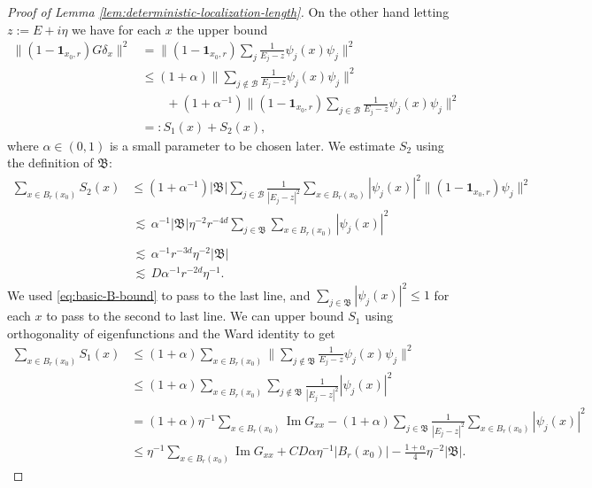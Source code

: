 \documentclass[11pt]{amsart}
\def\One{{\mathbf{1}}}
\newcommand{\Impt}{\operatorname*{Im}}
\def\lsim{{\,\lesssim\,}}
\newcommand{\mcal}[1]{{\mathcal{#1}}}
\numberwithin{equation}{section}
\numberwithin{theorem}{section}
\begin{document}
\begin{proof}[Proof of Lemma \ref{lem:deterministic-localization-length}]
On the other hand letting $z:= E + i\eta$ we have for each $x$ the upper bound
\begin{equation}
\label{eq:two-bd}
\begin{aligned}
\|(1-\One_{x_0,r}) G\delta_x\|^2
&= \|(1-\One_{x_0,r}) \sum_j \frac{1}{E_j-z} \psi_j(x) \psi_j\|^2 \\
&\leq (1+\alpha) \|\sum_{j\not\in\mcal{B}} \frac{1}{E_j-z} \psi_j(x) \psi_j\|^2 \\
&\qquad + (1+\alpha^{-1})\|(1-\One_{x_0,r}) \sum_{j\in\mcal{B}} \frac{1}{E_j-z} \psi_j(x) \psi_j\|^2 \\
&=: S_1(x) + S_2(x),
\end{aligned}
\end{equation}
where $\alpha\in (0,1)$ is a small parameter to be chosen later. We estimate
$S_2$  using the definition of $\mathfrak{B}$:
\begin{align*}
\sum_{x\in B_r(x_0)} S_2(x)
&\leq (1+\alpha^{-1}) |\mathfrak{B}| \sum_{j\in\mcal{B}} \frac{1}{|E_j-z|^2} \sum_{x\in B_r(x_0)}|\psi_j(x)|^2
\|(1-\One_{x_0,r})\psi_j\|^2 \\
&\lsim \alpha^{-1} |\mathfrak{B}| \eta^{-2} r^{-4d}\sum_{j\in\mathfrak{B}}  \sum_{x\in B_r(x_0)}|\psi_j(x)|^2\\\\
& \lsim \alpha^{-1}r^{-3d}\eta^{-2} |\mathfrak{B}|\\
& \lsim D\alpha^{-1}r^{-2d}\eta^{-1} .
\end{align*}
We used \eqref{eq:basic-B-bound} to pass to the last line, and $\sum_{j\in \mathfrak{B}}|\psi_j(x)|^2 \leq 1$ for each $x$ to pass to the second to last line.
We can upper bound $S_1$ using orthogonality of eigenfunctions and the Ward identity to get
\begin{align*}
\sum_{x\in B_r(x_0)} S_1(x)
&\leq (1+\alpha) \sum_{x\in B_r(x_0)}
\| \sum_{j\not\in \mathfrak{B}} \frac{1}{E_j-z} \psi_j(x) \psi_j\|^2 \\
&\leq (1+\alpha) \sum_{x\in B_r(x_0)}
\sum_{j\not\in\mathfrak{B}} \frac{1}{|E_j-z|^2} |\psi_j(x)|^2 \\
&= (1+\alpha) \eta^{-1}\sum_{x\in B_r(x_0)} \Impt G_{xx}
- (1+\alpha) \sum_{j\in \mathfrak{B}} \frac{1}{|E_j-z|^2}\sum_{x\in B_r(x_0)} |\psi_j(x)|^2  \\
&\leq \eta^{-1} \sum_{x\in B_r(x_0)} \Impt G_{xx}
+ CD\alpha \eta^{-1} |B_r(x_0)|
- \frac{1+\alpha}{4}\eta^{-2} |\mathfrak{B}|.
\end{align*}


\end{proof}
\end{document}
